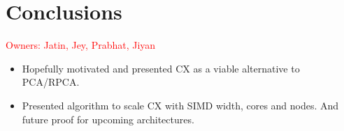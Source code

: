 \section{Conclusions}
\label{sec:conclusion}

\textcolor{red}{Owners: Jatin, Jey, Prabhat, Jiyan}
\begin{itemize}
  \item Hopefully motivated and presented CX as a viable alternative to PCA/RPCA. 
  \item Presented algorithm to scale CX with SIMD width, cores and nodes. And future proof for upcoming architectures.
\end{itemize}
